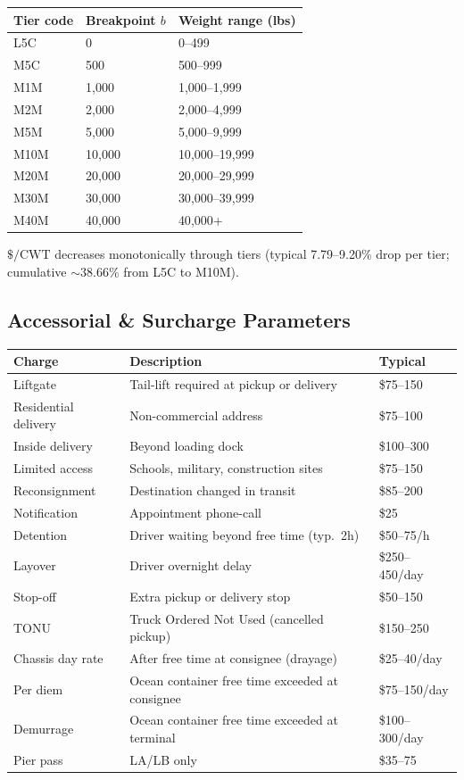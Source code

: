 \documentclass[11pt,a4paper]{article}
\theoremstyle{definition}
\begin{document}
\begin{center}
\begin{tabular}{lll}
\toprule
Tier code & Breakpoint $b$ & Weight range (lbs) \\
\midrule
L5C  & 0     & 0--499 \\
M5C  & 500   & 500--999 \\
M1M  & 1{,}000 & 1{,}000--1{,}999 \\
M2M  & 2{,}000 & 2{,}000--4{,}999 \\
M5M  & 5{,}000 & 5{,}000--9{,}999 \\
M10M & 10{,}000 & 10{,}000--19{,}999 \\
M20M & 20{,}000 & 20{,}000--29{,}999 \\
M30M & 30{,}000 & 30{,}000--39{,}999 \\
M40M & 40{,}000 & 40{,}000+ \\
\bottomrule
\end{tabular}
\end{center}

$\$/\text{CWT}$ decreases monotonically through tiers (typical 7.79--9.20\% drop per tier;
cumulative $\sim$38.66\% from L5C to M10M).

\subsection{Accessorial \& Surcharge Parameters}

\begin{center}
\begin{tabular}{lp{8cm}l}
\toprule
Charge & Description & Typical \\
\midrule
Liftgate & Tail-lift required at pickup or delivery & \$75--150 \\
Residential delivery & Non-commercial address & \$75--100 \\
Inside delivery & Beyond loading dock & \$100--300 \\
Limited access & Schools, military, construction sites & \$75--150 \\
Reconsignment & Destination changed in transit & \$85--200 \\
Notification & Appointment phone-call & \$25 \\
Detention & Driver waiting beyond free time (typ.\ 2h) & \$50--75/h \\
Layover & Driver overnight delay & \$250--450/day \\
Stop-off & Extra pickup or delivery stop & \$50--150 \\
TONU & Truck Ordered Not Used (cancelled pickup) & \$150--250 \\
Chassis day rate & After free time at consignee (drayage) & \$25--40/day \\
Per diem & Ocean container free time exceeded at consignee & \$75--150/day \\
Demurrage & Ocean container free time exceeded at terminal & \$100--300/day \\
Pier pass & LA/LB only & \$35--75 \\
\bottomrule
\end{tabular}
\end{center}
\end{document}
